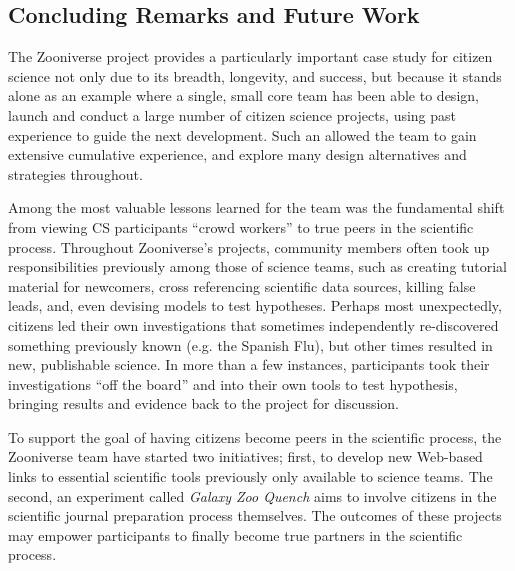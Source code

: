 \documentclass{sigchi}
\begin{document}
\begin{spacing}{0.97}
\section{Concluding Remarks and Future Work}

The Zooniverse project provides a particularly important case study for citizen science not only due to its breadth, longevity, and success, but because it stands alone as an example where a single, small core team has been able to design, launch and conduct a large number of citizen science projects, using past experience to guide the next development. Such an allowed the team to gain extensive cumulative experience, and explore many design alternatives and strategies throughout. %

Among the most valuable lessons learned for the team was the fundamental shift from viewing CS participants ``crowd workers'' to true peers in the scientific process. Throughout Zooniverse's projects, community members often took up responsibilities previously among those of science teams, such as creating tutorial material for newcomers, cross referencing scientific data sources, killing false leads, and, even devising models to test hypotheses. Perhaps most unexpectedly, citizens led their own investigations that sometimes independently re-discovered something previously known (e.g. the Spanish Flu), but other times resulted in new, publishable science. In more than a few instances, participants took their investigations ``off the board'' and into their own tools to test hypothesis, bringing results and evidence back to the project for discussion. 

To support the goal of having citizens become peers in the scientific process, the Zooniverse team have started two initiatives; first, to develop new Web-based links to essential scientific tools previously only available to science teams. The second, an experiment called \emph{Galaxy Zoo Quench} aims to involve citizens in the scientific journal preparation process themselves. The outcomes of these projects may empower participants to finally become true partners in the scientific process. 



\end{spacing}
\end{document}
